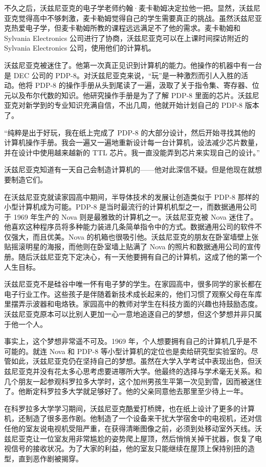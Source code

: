 \documentclass[12pt,UTF8]{ctexbook}
\begin{document}
不久之后，沃兹尼亚克的电子学老师约翰·麦卡勒姆决定拉他一把。显然，沃兹尼亚克觉得高中不够刺激，麦卡勒姆觉得自己的学生需要真正的挑战。虽然沃兹尼亚克热爱电子学，但麦卡勒姆所教的课程远远满足不了他的需求。麦卡勒姆和 Sylvania Electronics 公司进行了协商，沃兹尼亚克可以在上课时间探访附近的 Sylvania Electronics 公司，使用他们的计算机。

沃兹尼亚克被迷住了。他第一次真正见识到计算机的能力。他操作的机器中有一台是 DEC 公司的 PDP-8。对沃兹尼亚克来说，“玩”是一种激烈而引人入胜的活动。他将 PDP-8 的操作手册从头到尾读了一遍，汲取了关于指令集、寄存器、位元以及布尔代数的知识。他研究操作手册是为了了解 PDP-8 里面的芯片。沃兹尼亚克对新学到的专业知识充满自信，不出几周，他就开始计划自己的 PDP-8 版本了。

“纯粹是出于好玩，我在纸上完成了 PDP-8 的大部分设计，然后开始寻找其他的计算机操作手册。我会一遍又一遍地重新设计每一台计算机，设法减少芯片数量，并在设计中使用越来越新的 TTL 芯片。我一直没能弄到芯片来实现自己的设计。”

沃兹尼亚克知道有一天自己会制造计算机的——他对此深信不疑。但是他现在就想要制造它们。

在沃兹尼亚克就读家园高中期间，半导体技术的发展让创造类似于 PDP-8 那样的小型计算机成为可能。PDP-8 是当时最流行的计算机机型之一，而数据通用公司于 1969 年生产的 Nova 则是最雅致的计算机之一。沃兹尼亚克被 Nova 迷住了。他喜欢这种程序员将多种能力装进几条简单指令中的方式。数据通用公司的软件不仅强大，而且优美。Nova 的机箱也很吸引他。沃兹尼亚克的朋友在卧室墙壁上张贴摇滚明星的海报，而他则在卧室墙上贴满了 Nova 的照片和数据通用公司的宣传册。随后沃兹尼亚克下定决心，有一天他要拥有自己的计算机，这成了他的第一个人生目标。

沃兹尼亚克不是硅谷中唯一怀有电子梦的学生。在家园高中，很多同学的家长都在电子行业工作。这些孩子是伴随着新技术成长起来的，他们习惯了观察父母在车库里摆弄示波器和电烙铁。家园高中的教师对学生在科技方面的兴趣也持鼓励态度。沃兹尼亚克原本可以比别人更加一心一意地追逐自己的梦想，但这个梦想并非只属于他一个人。

事实上，这个梦想非常遥不可及。1969 年，个人想要拥有自己的计算机几乎是不可能的。就连 Nova 和 PDP-8 等小型计算机的定位也是卖给研究型实验室的。尽管如此，沃兹尼亚克仍在坚持自己的梦想。虽然在大学入学考试中表现出色，但沃兹尼亚克并没有花太多心思考虑要进哪所大学。他最终的选择与学术毫无关系。和几个朋友一起参观科罗拉多大学时，这个加州男孩生平第一次见到雪，因而被迷住了。他断定科罗拉多大学就足够好了。他的父亲同意他去那里至少待上一年。

在科罗拉多大学学习期间，沃兹尼亚克酷爱打桥牌，也在纸上设计了更多的计算机，还制造了很多恶作剧。他制造了一个设备来干扰大学宿舍中的电视机，还对信任他的室友说电视机受阻严重，在获得清晰图像之前，必须到处移动室外天线。沃兹尼亚克让一位室友用非常尴尬的姿势爬上屋顶，然后悄悄关掉干扰器，恢复了电视信号的接收状况。为了大家的利益，他的室友只能继续在屋顶上保持别扭的造型，直到恶作剧被揭穿。
\end{document}
